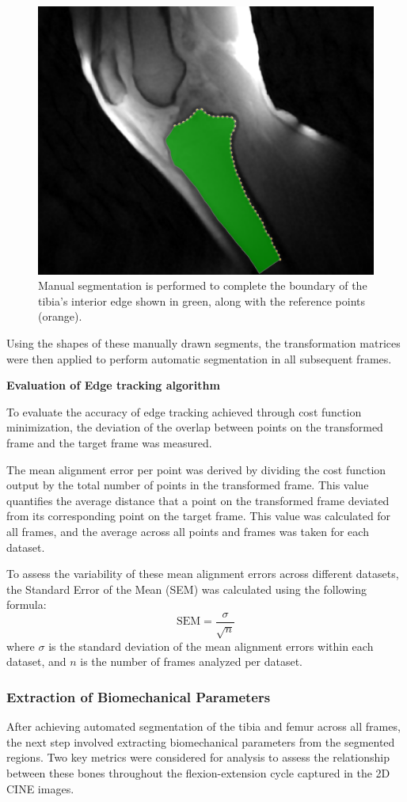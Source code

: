 \documentclass{micro-econ-thesis}
\begin{document}
\begin{figure} [H]
	\centering
	\includegraphics[width=0.7\linewidth]{manual_segment}
	\caption{Manual segmentation is performed to complete the boundary of the tibia's interior edge shown in green, along with the reference points (orange).}
	\label{fig:manualsegment}
\end{figure}

Using the shapes of these manually drawn segments, the transformation matrices were then applied to perform automatic segmentation in all subsequent frames. 

\textbf{Evaluation of Edge tracking algorithm}

To evaluate the accuracy of edge tracking achieved through cost function minimization, the deviation of the overlap between points on the transformed frame and the target frame was measured. 

The mean alignment error per point was derived by dividing the cost function output by the total number of points in the transformed frame. This value quantifies the average distance that a point on the transformed frame deviated from its corresponding point on the target frame. This value was calculated for all frames, and the average across all points and frames was taken for each dataset.

To assess the variability of these mean alignment errors across different datasets, the Standard Error of the Mean (SEM) was calculated using the following formula:
\begin{equation}
	\text{SEM} = \frac{\sigma}{\sqrt{n}}
\end{equation}
where $\sigma$ is the standard deviation of the mean alignment errors within each dataset, and $n$ is the number of frames analyzed per dataset.

\subsubsection{Extraction of Biomechanical Parameters}
After achieving automated segmentation of the tibia and femur across all frames, the next step involved extracting biomechanical parameters from the segmented regions. Two key metrics were considered for analysis to assess the relationship between these bones throughout the flexion-extension cycle captured in the 2D CINE images.
\end{document}
